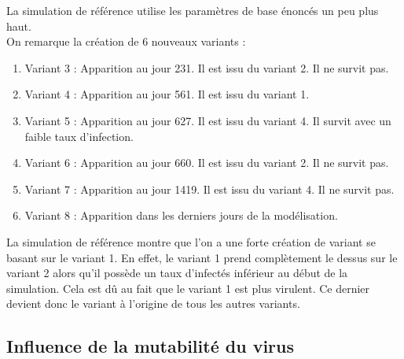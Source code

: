 \documentclass{article}
\begin{document}
\noindent
La simulation de référence utilise les paramètres de base énoncés un peu plus haut. \\
On remarque la création de 6 nouveaux variants :
\begin{enumerate}
    \item Variant 3 : Apparition au jour 231. Il est issu du variant 2. Il ne survit pas.
    \item Variant 4 : Apparition au jour 561. Il est issu du variant 1.
    \item Variant 5 : Apparition au jour 627. Il est issu du variant 4. Il survit avec un faible taux d'infection.
    \item Variant 6 : Apparition au jour 660. Il est issu du variant 2. Il ne survit pas.
    \item Variant 7 : Apparition au jour 1419. Il est issu du variant 4. Il ne survit pas.
    \item Variant 8 : Apparition dans les derniers jours de la modélisation.
\end{enumerate}
\noindent
La simulation de référence montre que l'on a une forte création de variant se basant sur le variant 1. En effet, le variant 1 prend complètement le dessus sur le variant 2 alors qu'il possède un taux d'infectés inférieur au début de la simulation. Cela est dû au fait que le variant 1 est plus virulent. Ce dernier devient donc le variant à l'origine de tous les autres variants.

\subsection{Influence de la mutabilité du virus}
\end{document}
